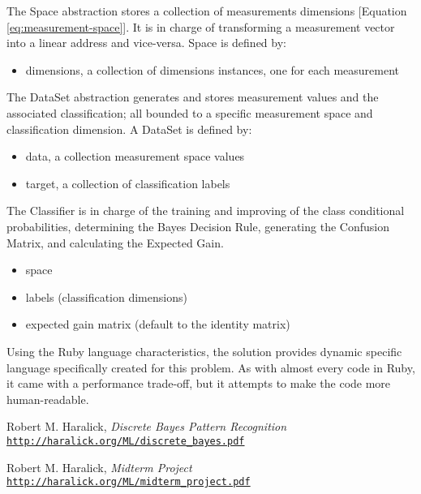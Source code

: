 \documentclass[letterpaper, conference]{IEEEtran}
\begin{document}
The Space abstraction stores a collection of measurements dimensions [Equation \ref{eq:measurement-space}]. It is in charge of transforming a measurement vector into a linear address and vice-versa. Space is defined by:

\begin{itemize}
  \item dimensions, a collection of dimensions instances, one for each measurement
\end{itemize}

The DataSet abstraction generates and stores measurement values and the associated classification; all bounded to a specific measurement space and classification dimension. A DataSet is defined by:

\begin{itemize}
  \item data, a collection measurement space values
  \item target, a collection of classification labels
\end{itemize}

The Classifier is in charge of the training and improving of the class conditional probabilities, determining the Bayes Decision Rule, generating the Confusion Matrix, and calculating the Expected Gain.

\begin{itemize}
  \item space
  \item labels (classification dimensions)
  \item expected gain matrix (default to the identity matrix)
\end{itemize}

Using the Ruby language characteristics, the solution provides dynamic specific language specifically created for this problem. As with almost every code in Ruby, it came with a performance trade-off, but it attempts to make the code more human-readable.

\begin{thebibliography}{2}

Robert M. Haralick,
\textit{Discrete Bayes Pattern Recognition}
\\\texttt{\url{http://haralick.org/ML/discrete_bayes.pdf}}

Robert M. Haralick,
\textit{Midterm Project}
\\\texttt{\url{http://haralick.org/ML/midterm_project.pdf}}

\end{thebibliography}
\end{document}
